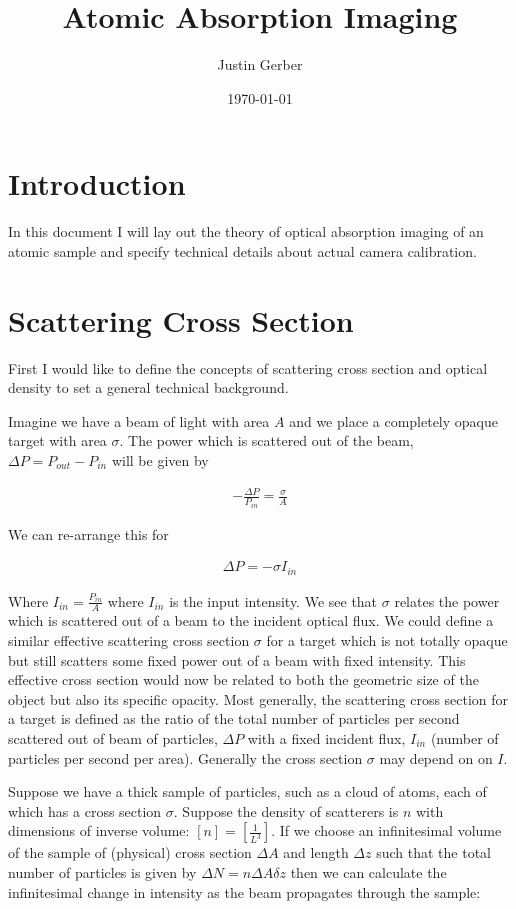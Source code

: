 \documentclass[12pt]{article}
\begin{document}
\title{Atomic Absorption Imaging}
\author{Justin Gerber}
\date{\today}
\maketitle

\section{Introduction}
In this document I will lay out the theory of optical absorption imaging of an atomic sample and specify technical details about actual camera calibration.

\section{Scattering Cross Section}

First I would like to define the concepts of scattering cross section and optical density to set a general technical background.

Imagine we have a beam of light with area $A$ and we place a completely opaque target with area $\sigma$.
The power which is scattered out of the beam, $\Delta P = P_{out} - P_{in}$ will be given by

\begin{align}
-\frac{\Delta P}{P_{in}} = \frac{\sigma}{A}
\end{align}

We can re-arrange this for

\begin{align}
\Delta P = - \sigma I_{in}
\end{align}

Where $I_{in} = \frac{P_{in}}{A}$ where $I_{in}$ is the input intensity.
We see that $\sigma$ relates the power which is scattered out of a beam to the incident optical flux.
We could define a similar effective scattering cross section $\sigma$ for a target which is not totally opaque but still scatters some fixed power out of a beam with fixed intensity.
This effective cross section would now be related to both the geometric size of the object but also its specific opacity.
Most generally, the scattering cross section for a target is defined as the ratio of the total number of particles per second scattered out of beam of particles, $\Delta P$ with a fixed incident flux, $I_{in}$ (number of particles per second per area).
Generally the cross section $\sigma$ may depend on on $I$.

Suppose we have a thick sample of particles, such as a cloud of atoms, each of which has a cross section $\sigma$.
Suppose the density of scatterers is $n$ with dimensions of inverse volume: $[n] = \left[\frac{1}{L^3}\right]$.
If we choose an infinitesimal volume of the sample of (physical) cross section $\Delta A$ and length $\Delta z$ such that the total number of particles is given by $\Delta N = n \Delta A \delta z$ then we can calculate the infinitesimal change in intensity as the beam propagates through the sample:
\end{document}
